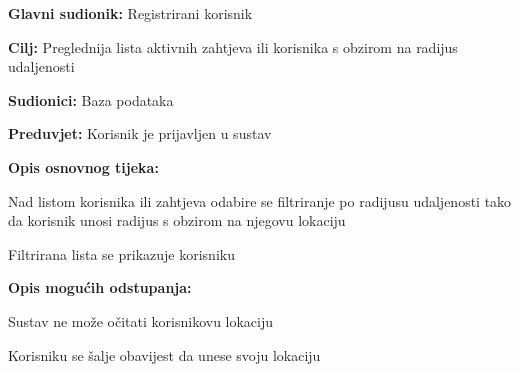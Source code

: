 \noindent {}
\begin{packed_item}
	
	\item \textbf{Glavni sudionik: } Registrirani korisnik
	\item  \textbf{Cilj:} Preglednija lista aktivnih zahtjeva ili korisnika s obzirom na radijus udaljenosti 
	\item  \textbf{Sudionici:} Baza podataka
	\item  \textbf{Preduvjet:} Korisnik je prijavljen u sustav
	\item  \textbf{Opis osnovnog tijeka:}
	
	\item[] \begin{packed_enum}
		
		\item Nad listom korisnika ili zahtjeva odabire se filtriranje po radijusu udaljenosti tako da korisnik unosi radijus s obzirom na njegovu lokaciju
		\item Filtrirana lista se prikazuje korisniku
	\end{packed_enum}
	\item  \textbf{Opis mogućih odstupanja:}
	
	\item[] \begin{packed_item}
		
		\item[1.a] 	Sustav ne može očitati korisnikovu lokaciju
		\item[] \begin{packed_enum}
			
			\item Korisniku se šalje obavijest da unese svoju lokaciju
			
		\end{packed_enum}
		
	\end{packed_item}
	
\end{packed_item}

